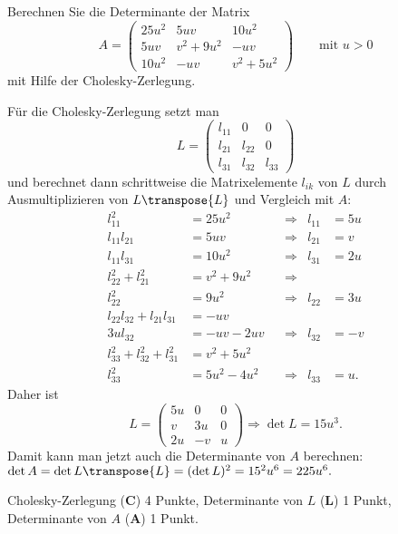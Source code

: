 %
Berechnen Sie die Determinante der Matrix 
\[
A=
\begin{pmatrix}
25u^2 &     5uv   & 10u^2 \\
5uv   &  v^2+9u^2 & -uv   \\
10u^2 &     -uv   & v^2+5u^2
\end{pmatrix}
\qquad\text{mit $u>0$}
\]
mit Hilfe der Cholesky-Zerlegung.


\begin{loesung}
Für die Cholesky-Zerlegung setzt man 
\[
L = \begin{pmatrix}
l_{11}& 0 & 0 \\
l_{21}&l_{22}& 0 \\
l_{31}&l_{32}&l_{33}
\end{pmatrix}
\]
und berechnet dann schrittweise die Matrixelemente $l_{ik}$ von $L$
durch Ausmultiplizieren von $L\transpose{L}$ und Vergleich mit $A$:
\[
\begin{aligned}
l_{11}^2                   &=  25u^2       &&\Rightarrow&    l_{11} &= 5u  \\
l_{11}l_{21}               &=  5uv         &&\Rightarrow&    l_{21} &= v   \\
l_{11}l_{31}               &=  10u^2       &&\Rightarrow&    l_{31} &= 2u  \\
l_{22}^2+l_{21}^2          &=  v^2 + 9u^2  &&\Rightarrow&           &      \\
l_{22}^2                   &=  9u^2        &&\Rightarrow&    l_{22} &= 3u  \\
l_{22}l_{32}+l_{21}l_{31}  &=  -uv         &&           &           &      \\
3ul_{32}                   &= -uv-2uv      &&\Rightarrow&    l_{32} &= -v  \\
l_{33}^2+l_{32}^2+l_{31}^2 &=  v^2+5u^2    &&           &           &      \\
l_{33}^2                   &=  5u^2-4u^2   &&\Rightarrow&    l_{33} &=  u.
\end{aligned}
\]
Daher ist
\[
L=\begin{pmatrix}
 5u &  0 & 0 \\
  v & 3u & 0 \\
 2u & -v & u
\end{pmatrix}
\Rightarrow
\det L
=
15u^3.
\]
Damit kann man jetzt auch die Determinante von $A$ berechnen:
$\det A = \det L\transpose{L} = (\det L)^2 = 15^2u^6 = 225u^6.$
\end{loesung}

\begin{bewertung}
Cholesky-Zerlegung ({\bf C}) 4 Punkte,
Determinante von $L$ ({\bf L}) 1 Punkt,
Determinante von $A$ ({\bf A}) 1 Punkt.
\end{bewertung}

